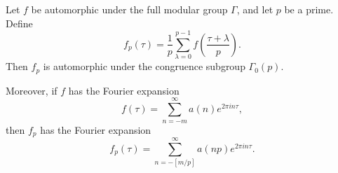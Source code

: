 \begin{theorem}
\label{thm:4.5}
Let $f$ be automorphic under the full modular group $\Gamma$, and let $p$ be a prime. Define
$$
f_p(\tau) = \frac{1}{p} \sum_{\lambda=0}^{p-1} f\!\left(\frac{\tau + \lambda}{p}\right).
$$
Then $f_p$ is automorphic under the congruence subgroup $\Gamma_0(p)$.

Moreover, if $f$ has the Fourier expansion
$$
f(\tau) = \sum_{n=-m}^{\infty} a(n) e^{2\pi i n \tau},
$$
then $f_p$ has the Fourier expansion
$$
f_p(\tau) = \sum_{n=-[m/p]}^{\infty} a(np) e^{2\pi i n \tau}.
$$
\end{theorem}
